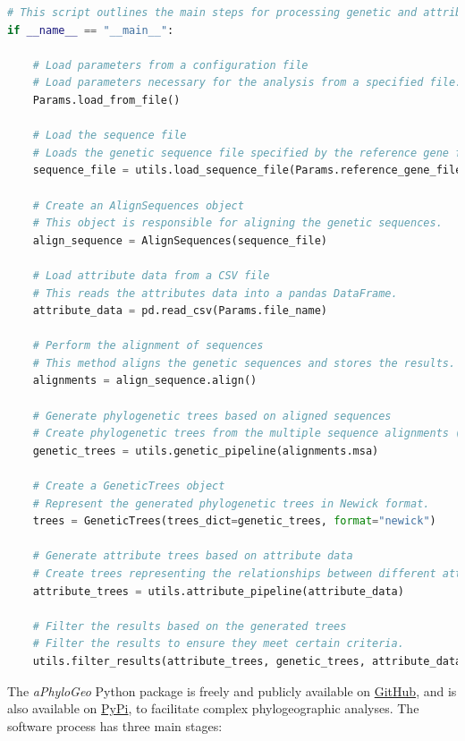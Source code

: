 \begin{lstlisting}[label=lst:main,language=Python,caption=Main script for tutorial using the aPhyloGeo package.]
# This script outlines the main steps for processing genetic and attribute data using the aPhyloGeo package.
if __name__ == "__main__":

    # Load parameters from a configuration file
    # Load parameters necessary for the analysis from a specified file.
    Params.load_from_file()

    # Load the sequence file
    # Loads the genetic sequence file specified by the reference gene filepath.
    sequence_file = utils.load_sequence_file(Params.reference_gene_filepath)

    # Create an AlignSequences object
    # This object is responsible for aligning the genetic sequences.
    align_sequence = AlignSequences(sequence_file)

    # Load attribute data from a CSV file
    # This reads the attributes data into a pandas DataFrame.
    attribute_data = pd.read_csv(Params.file_name)

    # Perform the alignment of sequences
    # This method aligns the genetic sequences and stores the results.
    alignments = align_sequence.align()

    # Generate phylogenetic trees based on aligned sequences
    # Create phylogenetic trees from the multiple sequence alignments (MSA).
    genetic_trees = utils.genetic_pipeline(alignments.msa)
    
    # Create a GeneticTrees object
    # Represent the generated phylogenetic trees in Newick format.
    trees = GeneticTrees(trees_dict=genetic_trees, format="newick")
   
    # Generate attribute trees based on attribute data
    # Create trees representing the relationships between different attributes.
    attribute_trees = utils.attribute_pipeline(attribute_data)
    
    # Filter the results based on the generated trees
    # Filter the results to ensure they meet certain criteria.
    utils.filter_results(attribute_trees, genetic_trees, attribute_data)
\end{lstlisting}

The \textit{aPhyloGeo} Python package is freely and publicly available on \href{https://github.com/tahiri-lab/aPhyloGeo}{GitHub}, and is also available on \href{https://pypi.org/project/aphylogeo/}{PyPi}, to facilitate complex phylogeographic analyses. The software process has three main stages:

